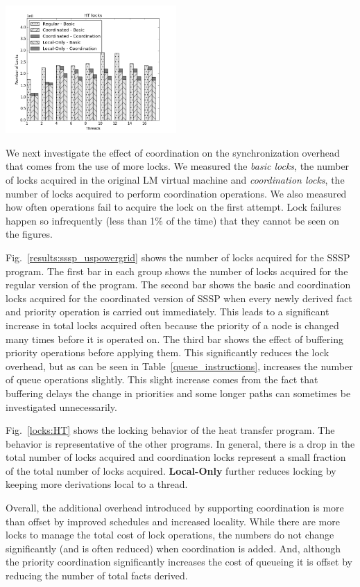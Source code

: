 \begin{topfig}
   \begin{center}
      \includegraphics[width=6.5cm]{results/locks/ht-locks.png}
   \end{center}
\end{topfig}

We next investigate the effect of coordination on the synchronization
overhead that comes from the use of more locks.  We measured the
\emph{basic locks}, the number of locks acquired
in the original LM virtual machine and \emph{coordination locks}, the
number of locks acquired to perform coordination operations.  We also
measured how often  operations fail to acquire
the lock on the first attempt.  Lock failures happen so infrequently
(less than 1\% of the time) that they cannot be seen on the figures.

Fig.~\ref{results:sssp_uspowergrid} shows the number of locks acquired
for the SSSP program.  The first bar in each group shows the number of
locks acquired for the regular version of the program.  The
second bar shows the basic and coordination locks acquired for the coordinated
version of SSSP when every newly derived fact and priority operation is carried out
immediately.  This leads to a significant increase in total locks
acquired often because the priority of a node is changed many times
before it is operated on.  The third bar shows the effect of buffering
priority operations before applying them.  This significantly reduces
the lock overhead, but as can be seen in
Table~\ref{queue_instructions}, increases the number of queue operations
slightly.  This slight increase comes from the fact that buffering
delays the change in priorities and some longer paths can sometimes be
investigated unnecessarily.

Fig.~\ref{locks:HT} shows the locking behavior of the heat transfer
program.  The behavior is representative of the other programs. In general, there
is a drop in the total number of locks acquired and coordination locks
represent a small fraction of the total number of locks acquired. \textbf{Local-Only}
further reduces locking by keeping more derivations local to a thread.

Overall, the additional overhead introduced by supporting coordination
is more than offset by improved schedules and increased locality.
While there are more locks to manage the total cost of lock operations,
the numbers do not change significantly (and is often reduced) when coordination
is added.  And, although the priority coordination significantly
increases the cost of queueing it is offset by reducing the number of
total facts derived.
